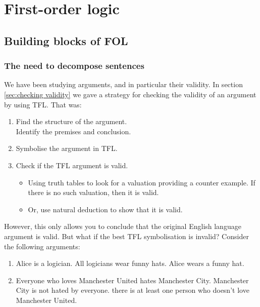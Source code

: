 \part{First-order logic}
\label{ch.FOL}
\chapter{Building blocks of FOL}\label{s:FOLBuildingBlocks}
\section{The need to decompose sentences}
We have been studying arguments, and in particular their validity. In section \ref{sec:checking validity} we gave a strategy for checking the validity of an argument by using TFL. That was:
\begin{highlighted}\begin{enumerate}
\item Find the structure of the argument. \\Identify the premises and conclusion.
\item \label{itm:validity-symbolise}Symbolise the argument in TFL.
\item \label{itm:validity-TTs} Check if the TFL argument is valid.\begin{itemize}\item Using truth tables to look for a valuation providing a counter example. If there is no such valuation, then it is valid.
\item Or, use natural deduction to show that it is valid.
\end{itemize}
\end{enumerate}
\end{highlighted}

However, this only allows you to conclude that the original English language argument is valid. But what if the best TFL symbolisation is invalid? Consider the following arguments:
\begin{enumerate}
\item \begin{earg}
\label{willard1}
\prem Alice is a logician.
\prem All logicians wear funny hats.
\conc Alice wears a funny hat.
\end{earg}
\item \begin{earg}
\prem Everyone who loves Manchester United hates Manchester City.
\prem Manchester City is not hated by everyone.
\conc there is at least one person who doesn't love Manchester United. 
\end{earg}
\end{enumerate}

